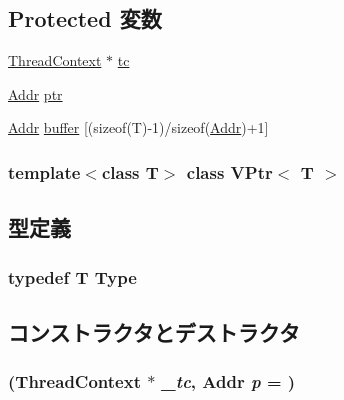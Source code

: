 \subsection*{Protected 変数}
\begin{DoxyCompactItemize}
\item 
\hyperlink{classThreadContext}{ThreadContext} $\ast$ \hyperlink{classVPtr_a4455a4759e69e5ebe68ae7298cbcc37d}{tc}
\item 
\hyperlink{base_2types_8hh_af1bb03d6a4ee096394a6749f0a169232}{Addr} \hyperlink{classVPtr_afbbc6404a3002307f96de20d0c5242c9}{ptr}
\item 
\hyperlink{base_2types_8hh_af1bb03d6a4ee096394a6749f0a169232}{Addr} \hyperlink{classVPtr_a79aef1f914ef7a7d47c7cff2c2b6cdf6}{buffer} \mbox{[}(sizeof(T)-\/1)/sizeof(\hyperlink{base_2types_8hh_af1bb03d6a4ee096394a6749f0a169232}{Addr})+1\mbox{]}
\end{DoxyCompactItemize}
\subsubsection*{template$<$class T$>$ class VPtr$<$ T $>$}



\subsection{型定義}
\hypertarget{classVPtr_a685b7a70f0ae1f2881cf8937d951c3b1}{
\subsubsection[{Type}]{\setlength{\rightskip}{0pt plus 5cm}typedef T {\bf Type}}}
\label{classVPtr_a685b7a70f0ae1f2881cf8937d951c3b1}


\subsection{コンストラクタとデストラクタ}
\hypertarget{classVPtr_a186059eb660226fff747f93fd32093c3}{
\subsubsection[{VPtr}]{ ({\bf ThreadContext} $\ast$ {\em \_\-tc}, \/  {\bf Addr} {\em p} = {})}}
\label{classVPtr_a186059eb660226fff747f93fd32093c3}



